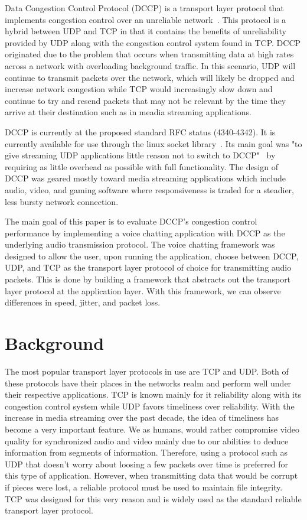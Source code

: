 \documentclass[letterpaper, 9 pt, balance, conference]{ieeeconf}
\begin{document}
Data Congestion Control Protocol (DCCP) is a transport layer protocol that
implements congestion control over an unreliable network~\cite{kohler06}. 
This protocol is a hybrid between UDP and TCP in that it contains the benefits
of unreliability provided by UDP along with the congestion control system found in 
TCP. DCCP originated due to the problem that occurs when transmitting data
at high rates across a network with overloading background traffic. In this
scenario, UDP will continue to transmit packets over the network, which will 
likely be dropped and increase network congestion while TCP would increasingly
slow down and continue to try and resend packets that may not be relevant by 
the time they arrive at their destination such as in meadia streaming 
applications.

DCCP is currently at the proposed standard RFC status (4340-4342).  It is 
currently available for use through the linux socket library~\cite{dccp_website}.  
Its main goal was "to give streaming UDP applications little reason
not to switch to DCCP"~\cite{dccp_wg} by requiring as little overhead as 
possible with full functionality.  The design of DCCP was geared mostly 
toward media streaming applications which include audio, video, and gaming
software where responsiveness is traded for a steadier, less bursty network
connection.

The main goal of this paper is to evaluate DCCP's congestion control performance
by implementing a voice chatting application with DCCP as the underlying audio
transmission protocol.  The voice chatting framework was designed to allow the
user, upon running the application, choose between DCCP, UDP, and TCP as the
transport layer protocol of choice for transmitting audio packets. This is done
by building a framework that abstracts out the transport layer protocol at the
application layer. With this framework, we can observe differences in speed, 
jitter, and packet loss.


\section{Background}
\label{sec:backg}

The most popular transport layer protocols in use are TCP and UDP.  Both of these
protocols have their places in the networks realm and perform well under their 
respective applications.  TCP is known mainly for it reliability along with its
congestion control system while UDP favors timeliness over reliability.  With the
increase in media streaming over the past decade, the idea of timeliness has
become a very important feature.  We as humans, would rather compromise video
quality for synchronized audio and video mainly due to our abilities to deduce
information from segments of information.  Therefore, using a protocol such as UDP
that doesn't worry about loosing a few packets over time is preferred for this type 
of application.  However, when transmitting data that would be corrupt if pieces 
were lost, a reliable protocol must be used to maintain file integrity.  TCP was
designed for this very reason and is widely used as the standard reliable transport
layer protocol.
\end{document}
